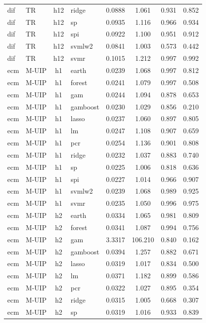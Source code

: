 \begin{ThreePartTable}
\begin{longtable}[t]{llclcccc}
dif & TR & h12 & ridge & 0.0888 & 1.061 & 0.931 & 0.852\\
dif & TR & h12 & sp & 0.0935 & 1.116 & 0.966 & 0.934\\
dif & TR & h12 & spi & 0.0922 & 1.100 & 0.951 & 0.912\\
dif & TR & h12 & svmlw2 & 0.0841 & 1.003 & 0.573 & 0.442\\
dif & TR & h12 & svmr & 0.1015 & 1.212 & 0.997 & 0.992\\
\addlinespace
ecm & M-UIP & h1 & earth & 0.0239 & 1.068 & 0.997 & 0.812\\
ecm & M-UIP & h1 & forest & 0.0241 & 1.079 & 0.997 & 0.508\\
ecm & M-UIP & h1 & gam & 0.0244 & 1.094 & 0.878 & 0.653\\
ecm & M-UIP & h1 & gamboost & 0.0230 & 1.029 & 0.856 & 0.210\\
ecm & M-UIP & h1 & lasso & 0.0237 & 1.060 & 0.897 & 0.805\\
ecm & M-UIP & h1 & lm & 0.0247 & 1.108 & 0.907 & 0.659\\
ecm & M-UIP & h1 & pcr & 0.0254 & 1.136 & 0.901 & 0.808\\
ecm & M-UIP & h1 & ridge & 0.0232 & 1.037 & 0.883 & 0.740\\
ecm & M-UIP & h1 & sp & 0.0225 & 1.006 & 0.818 & 0.636\\
ecm & M-UIP & h1 & spi & 0.0227 & 1.014 & 0.966 & 0.907\\
ecm & M-UIP & h1 & svmlw2 & 0.0239 & 1.068 & 0.989 & 0.925\\
ecm & M-UIP & h1 & svmr & 0.0235 & 1.050 & 0.996 & 0.975\\
\addlinespace
ecm & M-UIP & h2 & earth & 0.0334 & 1.065 & 0.981 & 0.809\\
ecm & M-UIP & h2 & forest & 0.0341 & 1.087 & 0.994 & 0.756\\
ecm & M-UIP & h2 & gam & 3.3317 & 106.210 & 0.840 & 0.162\\
ecm & M-UIP & h2 & gamboost & 0.0394 & 1.257 & 0.882 & 0.671\\
ecm & M-UIP & h2 & lasso & 0.0319 & 1.017 & 0.834 & 0.500\\
ecm & M-UIP & h2 & lm & 0.0371 & 1.182 & 0.899 & 0.586\\
ecm & M-UIP & h2 & pcr & 0.0322 & 1.027 & 0.895 & 0.354\\
ecm & M-UIP & h2 & ridge & 0.0315 & 1.005 & 0.668 & 0.307\\
ecm & M-UIP & h2 & sp & 0.0319 & 1.016 & 0.933 & 0.839\\

\end{longtable}
\end{ThreePartTable}
